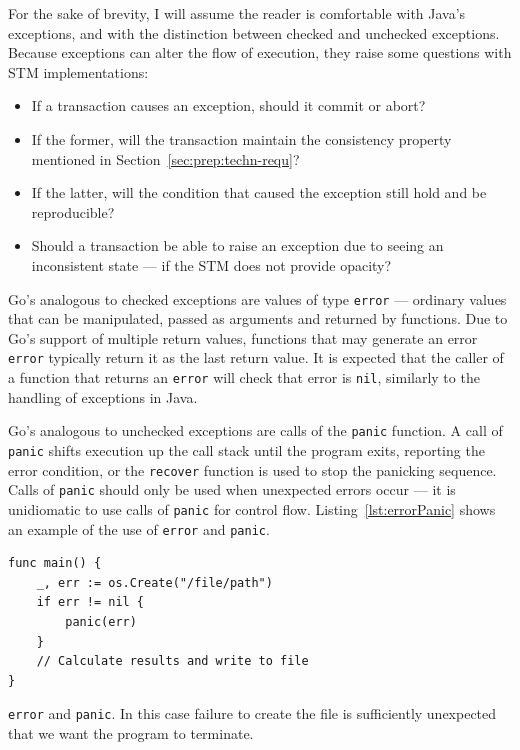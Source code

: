 \documentclass[12pt,a4paper,oneside,openright]{report}
\newcommand{\mycaption}[2]{\caption[#1]{#1 #2}}
\newcommand{\goType}[1]{\texttt{#1}}
\newcommand{\goValue}[1]{\texttt{#1}}
\newcommand{\goFunc}[1]{\texttt{#1}}
\begin{document}
For the sake of brevity, I will assume the reader is comfortable with
Java's exceptions, and with the distinction between checked and
unchecked exceptions. Because exceptions can alter the flow of
execution, they raise some questions with STM implementations:

\begin{itemize}
\item If a transaction causes an exception, should it commit or abort?
\item If the former, will the transaction maintain the consistency
  property mentioned in Section~\ref{sec:prep:techn-requ}?
\item If the latter, will the condition that caused the exception
  still hold and be reproducible?
\item Should a transaction be able to raise an exception due to seeing
  an inconsistent state --- if the STM does not provide opacity?
\end{itemize}

Go's analogous to checked exceptions are values of type \goType{error}
--- ordinary values that can be manipulated, passed as arguments and
returned by functions.  Due to Go's support of multiple return values,
functions that may generate an error \goType{error} typically return
it as the last return value. It is expected that the caller of a
function that returns an \goType{error} will check that error is
\goValue{nil}, similarly to the handling of exceptions in Java.

Go's analogous to unchecked exceptions are calls of the \goFunc{panic}
function. A call of \goFunc{panic} shifts execution up the call stack
until the program exits, reporting the error condition, or the
\goFunc{recover} function is used to stop the panicking
sequence. Calls of \goFunc{panic} should only be used when unexpected
errors occur --- it is unidiomatic to use calls of \goFunc{panic} for
control flow. Listing~\ref{lst:errorPanic} shows an example of the use
of \goType{error} and \goFunc{panic}.

\begin{Listing}[hbtp]
\begin{lstlisting}
func main() {
    _, err := os.Create("/file/path")
    if err != nil {
        panic(err)
    }
    // Calculate results and write to file
}
\end{lstlisting}

  \mycaption{\goType{error} and \goFunc{panic}.}{In this case failure
    to create the file is sufficiently unexpected that we want the
    program to terminate.}
  \label{lst:errorPanic}
\end{Listing}
\end{document}
